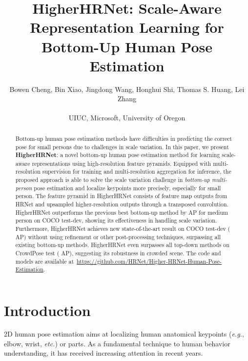 \documentclass[10pt,twocolumn,letterpaper]{article}
\begin{document}
\title{HigherHRNet: Scale-Aware Representation Learning for\\Bottom-Up Human Pose Estimation}

\author{Bowen Cheng, Bin Xiao, Jingdong Wang, Honghui Shi, Thomas S. Huang, Lei Zhang\\
\\
{UIUC, Microsoft, University of Oregon}}

\maketitle

\begin{abstract}
Bottom-up human pose estimation methods have difficulties in predicting the correct pose for small persons due to challenges in scale variation.
In this paper, 
we present \textbf{HigherHRNet}: a novel bottom-up human pose estimation method for learning scale-aware representations using high-resolution feature pyramids.
Equipped with multi-resolution supervision for training
and multi-resolution aggregation  for inference,
the proposed approach is able to solve
the scale variation challenge 
in \emph{bottom-up multi-person} pose estimation
and localize keypoints more precisely, especially for small person.
The feature pyramid in HigherHRNet
consists of feature map 
outputs from HRNet 
and upsampled higher-resolution outputs
through a transposed convolution.
HigherHRNet outperforms the previous best bottom-up method by  AP for medium person on COCO test-dev, showing its effectiveness in handling scale variation. Furthermore, HigherHRNet achieves new state-of-the-art result on COCO test-dev ( AP) without using refinement or other post-processing techniques, surpassing all existing bottom-up methods. HigherHRNet even surpasses all top-down methods on CrowdPose test ( AP), suggesting its robustness in crowded scene. 
The code and models are available at~\url{https://github.com/HRNet/Higher-HRNet-Human-Pose-Estimation}.
\end{abstract}

\section{Introduction}
2D human pose estimation aims at localizing human anatomical keypoints (\emph{e.g.}, elbow, wrist, \emph{etc.}) or parts. As a fundamental technique to human behavior understanding, it has received increasing attention in recent years.
\end{document}
